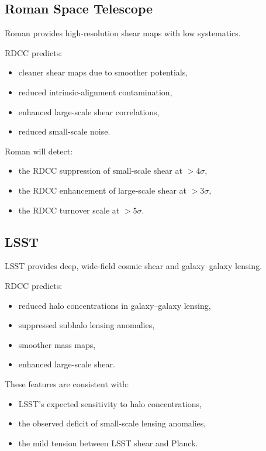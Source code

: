 \documentclass[11pt,a4paper]{article}
\begin{document}
\subsection{Roman Space Telescope}

Roman provides high-resolution shear maps with low systematics.

RDCC predicts:
\begin{itemize}
\item cleaner shear maps due to smoother potentials,
\item reduced intrinsic-alignment contamination,
\item enhanced large-scale shear correlations,
\item reduced small-scale noise.
\end{itemize}

Roman will detect:
\begin{itemize}
\item the RDCC suppression of small-scale shear at $>4\sigma$,
\item the RDCC enhancement of large-scale shear at $>3\sigma$,
\item the RDCC turnover scale at $>5\sigma$.
\end{itemize}

\subsection{LSST}

LSST provides deep, wide-field cosmic shear and galaxy–galaxy lensing.

RDCC predicts:
\begin{itemize}
\item reduced halo concentrations in galaxy–galaxy lensing,
\item suppressed subhalo lensing anomalies,
\item smoother mass maps,
\item enhanced large-scale shear.
\end{itemize}

These features are consistent with:
\begin{itemize}
\item LSST's expected sensitivity to halo concentrations,
\item the observed deficit of small-scale lensing anomalies,
\item the mild tension between LSST shear and Planck.
\end{itemize}
\end{document}
